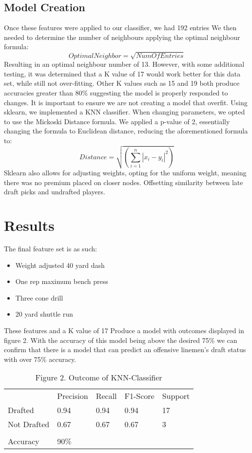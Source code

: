 \documentclass[confrence]{IEEEtran}
\begin{document}
\subsection*{Model Creation}
Once these features were applied to our classifier, we had 192 entries
We then needed to determine the number of neighbours applying the optimal neighbour formula: \[OptimalNeighbor = \sqrt{NumOfEntries}\]
Resulting in an optimal neighbour number of 13.
However, with some additional testing, it was determined that a K value of 17 would work better for this data set, while still not over-fitting.
Other K values such as 15 and 19 both produce accuracies greater than 80\% suggesting the model is properly responded to changes.
It is important to ensure we are not creating a model that overfit.
Using sklearn, we implemented a KNN classifier. When changing parameters, we opted to use the Mickoski Distance formula.
We applied a p-value of 2, essentially changing the formula to Euclidean distance, reducing the aforementioned formula to:
\[Distance = \sqrt{(\sum_{i=1}^n|x_i-y_i|^2)}\]
Sklearn also allows for adjusting weights, opting for the uniform weight, meaning there was no premium placed on closer nodes.
Offsetting similarity between late draft picks and undrafted players.
\section*{Results}
The final feature set is as such:
\begin{itemize}
    \item Weight adjusted 40 yard dash
    \item One rep maximum bench press
    \item Three cone drill
    \item 20 yard shuttle run
\end{itemize}
These features and a K value of 17 Produce a model with outcomes displayed in figure 2.
With the accuracy of this model being above the desired 75\% we can confirm that there is a model that can predict an offensive linemen's draft status with over 75\% accuracy.
\begin{table}[htbp]
    \begin{tabular}{lllll}
                    & Precision & Recall & F1-Score & Support \\
        Drafted     & 0.94      & 0.94   & 0.94     & 17      \\
        Not Drafted & 0.67      & 0.67   & 0.67     & 3       \\
                    &           &        &          &         \\
        Accuracy    & 90\%      &        &          &         \\
    \end{tabular}
    \caption{Figure 2. Outcome of KNN-Classifier}
\end{table}
\end{document}
